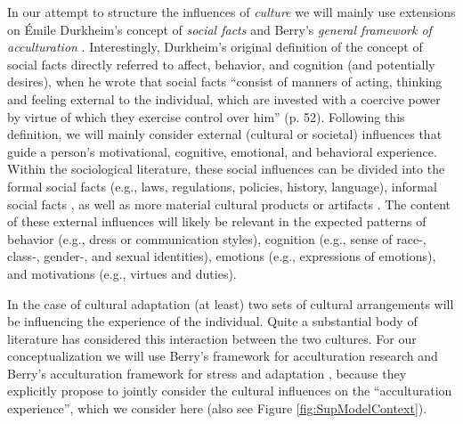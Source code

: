 \documentclass[man, 12pt, a4paper]{apa7}
\begin{document}
In our attempt to structure the influences of \textit{culture} we will mainly use extensions on Émile Durkheim's concept of \textit{social facts} \citep[e.g.,][]{Durkheim1982, Gilbert1989} and Berry's \textit{general framework of acculturation} \citep{Berry1997b, Berry2003, Berry2006a}. Interestingly, Durkheim's original definition of the concept of social facts directly referred to affect, behavior, and cognition (and potentially desires), when he wrote that social facts ``consist of manners of acting, thinking and feeling external to the individual, which are invested with a coercive power by virtue of which they exercise control over him'' (p. 52). Following this definition, we will mainly consider external (cultural or societal) influences that guide a person's motivational, cognitive, emotional, and behavioral experience. Within the sociological literature, these social influences can be divided into the formal social facts (e.g., laws, regulations, policies, history, language), informal social facts \citep[e.g., norms, values, beliefs, rituals, customs; also see][]{Herzog2018}, as well as more material cultural products or artifacts \citep[e.g., food, fashion, architecture, or arts, such as film, music, literature, and fine arts; e.g., see][]{Alexander2001}. The content of these external influences will likely be relevant in the expected patterns of behavior (e.g., dress or communication styles), cognition (e.g., sense of race-, class-, gender-, and sexual identities), emotions (e.g., expressions of emotions), and motivations (e.g., virtues and duties).

In the case of cultural adaptation (at least) two sets of cultural arrangements will be influencing the experience of the individual. Quite a substantial body of literature has considered this interaction between the two cultures. For our conceptualization we will use Berry's framework for acculturation research \citep[e.g., see][p. 15, Fig. 2]{Berry1997b} and Berry's acculturation framework for stress and adaptation \citep[e.g., see][p. 45, Fig. 4.1]{Berry2006a}, because they explicitly propose to jointly consider the cultural influences on the ``acculturation experience'', which we consider here (also see Figure \ref{fig:SupModelContext}).
\end{document}
